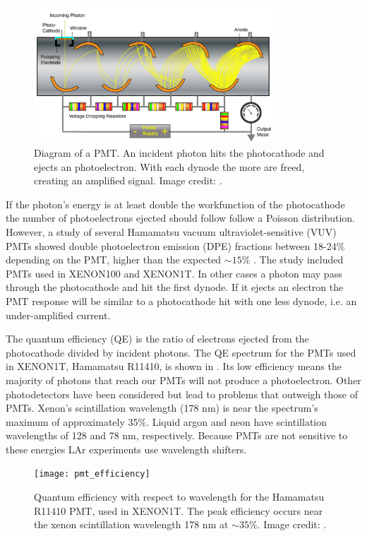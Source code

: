 \begin{figure}
\centering
\includegraphics[width=0.8\textwidth]{PMT1Better}
\caption{Diagram of a PMT.  An incident photon hits the photocathode and ejects an photoelectron.  With each dynode the more \electron are
freed, creating an amplified signal.  Image credit: .}
\label{fig:tpcs_pmts_pmt_diagram}
\end{figure}

If the photon's energy is at least double the workfunction of the photocathode the number of photoelectrons ejected should follow
follow a Poisson distribution.  However, a study of several Hamamatsu vacuum ultraviolet-sensitive (VUV) PMTs showed double
photoelectron emission
(DPE) fractions between 18-24\% depending on the PMT, higher than the expected ${\sim} 15\%$ .  The study included PMTs
used in XENON100 and XENON1T.  In other cases a photon may pass through the photocathode and hit
the first dynode.  If it ejects an electron the PMT response
will be similar to a photocathode hit with one less dynode, i.e. an under-amplified current.  

The quantum efficiency (QE) is the ratio of electrons ejected from the photocathode divided by incident photons.  The QE spectrum for
the PMTs used in XENON1T, Hamamatsu R11410, is shown in .  Its low efficiency means the majority of photons that
reach our PMTs will not produce a photoelectron.  Other photodetectors have been considered but lead to problems that outweigh those
of PMTs.  Xenon's scintillation wavelength (178 nm) is near the spectrum's maximum of approximately 35\%.  Liquid argon and neon have
scintillation wavelengths of 128 and 78 nm, respectively.  Because PMTs are not sensitive to these energies LAr experiments use
wavelength shifters.

\begin{figure}
\centering
\texttt{[image: pmt\_efficiency]}
\caption[Quantum efficiency with respect to wavelength for the Hamamatsu R11410 PMT, used in XENON1T.]{Quantum efficiency with respect to
wavelength for the Hamamatsu R11410 PMT, used in XENON1T.  The peak efficiency occurs near
the xenon scintillation wavelength 178 nm at ${\sim} 35 \%$.  Image credit: .}
\label{fig:tpcs_pmts_qe}
\end{figure}

